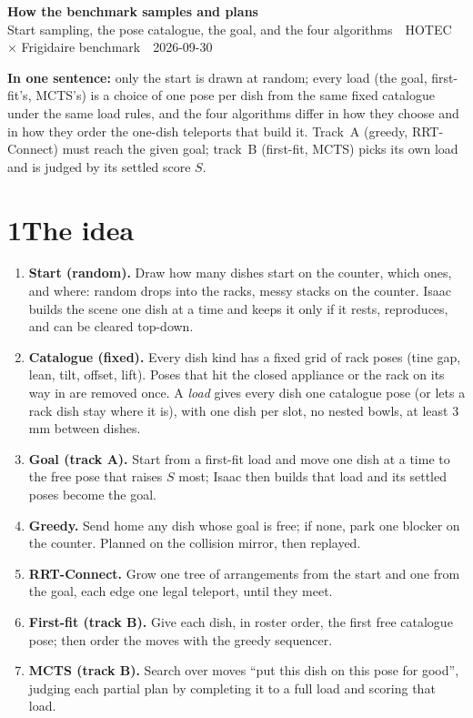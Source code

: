\documentclass[10pt]{article}
\begin{document}
\setlength{\abovedisplayskip}{4pt}\setlength{\belowdisplayskip}{4pt}
\setlength{\abovedisplayshortskip}{2pt}\setlength{\belowdisplayshortskip}{2pt}

{\LARGE\bfseries How the benchmark samples and plans}\\[3pt]
{\small Start sampling, the pose catalogue, the goal, and the four algorithms \,\textperiodcentered\, HOTEC $\times$ Frigidaire benchmark \,\textperiodcentered\, 2026-09-30}

\medskip
\textbf{In one sentence:} only the start is drawn at random; every load (the goal, first-fit's, MCTS's) is a choice of one pose per dish from the same fixed catalogue under the same load rules, and the four algorithms differ in how they choose and in how they order the one-dish teleports that build it.
Track~A (greedy, RRT-Connect) must reach the given goal; track~B (first-fit, MCTS) picks its own load and is judged by its settled score $S$.

\section*{1\quad The idea}
\begin{enumerate}
\item \textbf{Start (random).} Draw how many dishes start on the counter, which ones, and where: random drops into the racks, messy stacks on the counter. Isaac builds the scene one dish at a time and keeps it only if it rests, reproduces, and can be cleared top-down.
\item \textbf{Catalogue (fixed).} Every dish kind has a fixed grid of rack poses (tine gap, lean, tilt, offset, lift). Poses that hit the closed appliance or the rack on its way in are removed once. A \emph{load} gives every dish one catalogue pose (or lets a rack dish stay where it is), with one dish per slot, no nested bowls, at least 3\,mm between dishes.
\item \textbf{Goal (track A).} Start from a first-fit load and move one dish at a time to the free pose that raises $S$ most; Isaac then builds that load and its settled poses become the goal.
\item \textbf{Greedy.} Send home any dish whose goal is free; if none, park one blocker on the counter. Planned on the collision mirror, then replayed.
\item \textbf{RRT-Connect.} Grow one tree of arrangements from the start and one from the goal, each edge one legal teleport, until they meet.
\item \textbf{First-fit (track B).} Give each dish, in roster order, the first free catalogue pose; then order the moves with the greedy sequencer.
\item \textbf{MCTS (track B).} Search over moves ``put this dish on this pose for good'', judging each partial plan by completing it to a full load and scoring that load.
\end{enumerate}
\end{document}
